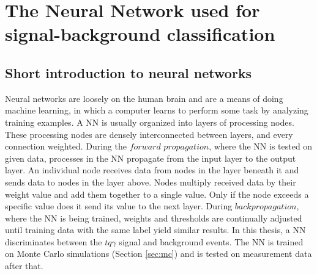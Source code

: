 \chapter{The Neural Network used for signal-background classification}
\section{Short introduction to neural networks}
Neural networks are loosely on the human brain and are a means of doing machine learning, in which a computer learns to perform some task by analyzing training examples. 
A NN is usually organized into layers of processing nodes. These processing nodes are densely interconnected between layers, and every connection weighted. 
During the $forward$ $propagation$, where the NN is tested on given data, processes in the NN propagate from the input layer to the output layer. An individual node receives data from nodes in the layer beneath it and sends data to nodes in the layer above. 
Nodes multiply received data by their weight value and add them together to a single value. Only if the node exceeds a specific value does it send its value to the next layer. During $backpropagation$, where the NN is being trained, weights and thresholds are continually adjusted until training data with the same label yield similar results.   
In this thesis, a NN discriminates between the $tq\gamma$ signal and background events. 
The NN is trained on Monte Carlo simulations (Section \ref{sec:mc}) and is tested on measurement data after that. 
